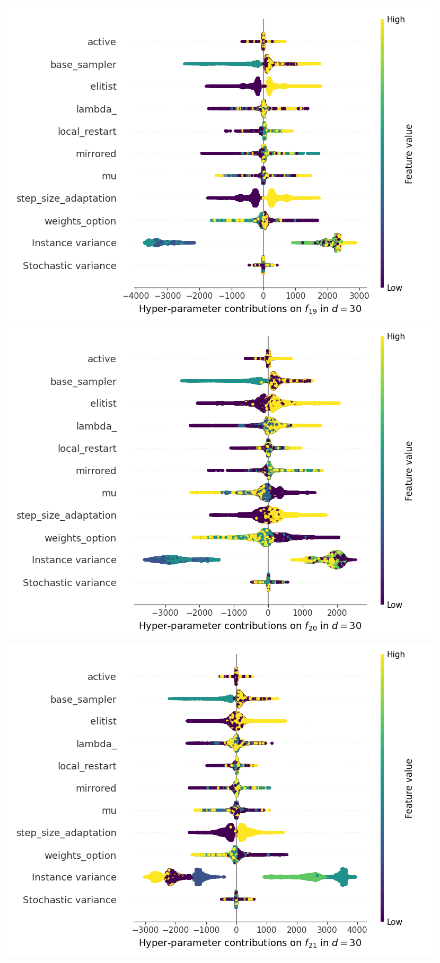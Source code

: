 \begin{figure}[t]
	\includegraphics[height=0.15\textheight,trim=60mm 0mm 30mm 0mm,clip]{cma_img_new/img_summary_f19_d30.png}
	\includegraphics[height=0.15\textheight,trim=60mm 0mm 0mm 0mm,clip]{cma_img_new/img_summary_f20_d30.png}
	\includegraphics[height=0.15\textheight,trim=0mm 0mm 30mm 0mm,clip]{cma_img_new/img_summary_f21_d30.png}

\end{figure}
